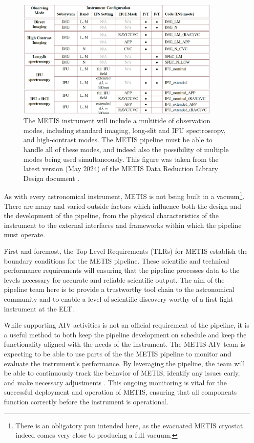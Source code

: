 \documentclass[a4paper]{spie}  %
\begin{document}
\begin{figure}
    \centering
    \includegraphics[width=0.9\textwidth]{SPIE_paper/figures/METIS_modes.png}
    \caption{The METIS instrument will include a multitide of observation modes, including standard imaging, long-slit and IFU spectroscopy, and high-contrast modes. The METIS pipeline must be able to handle all of these modes, and indeed also the possibility of multiple modes being used simultaneously. This figure was taken from the latest version (May 2024) of the METIS Data Reduction Library Design document \cite{DRLD}.}
    \label{fig:metis_modes}
\end{figure}


As with every astronomical instrument, METIS is not being built in a vacuum\footnote{There is an obligatory pun intended here, as the evacuated METIS cryostat indeed comes very close to producing a full vacuum.}. 
There are many and varied outside factors which influence both the design and the development of the pipeline, from the physical characteristics of the instrument to the external interfaces and frameworks within which the pipeline must operate.

First and foremost, the Top Level Requirements (TLRs) for METIS \cite{ESO-257869} establish the boundary conditions for the METIS pipeline.
These scientific and technical performance requirements will ensuring that the pipeline processes data to the levels necessary for accurate and reliable scientific output. 
The aim of the pipeline team here is to provide a trustworthy tool chain to the astronomical community and to enable a level of scientific discovery worthy of a first-light instrument at the ELT. 

While supporting AIV activities is not an official requirement of the pipeline, it is a useful method to both keep the pipeline development on schedule and keep the functionality aligned with the needs of the instrument. 
The METIS AIV team is expecting to be able to use parts of the the METIS pipeline to monitor and evaluate the instrument's performance.
By leveraging the pipeline, the team will be able to continuously track the behavior of METIS, identify any issues early, and make necessary adjustments . 
This ongoing monitoring is vital for the successful deployment and operation of METIS, ensuring that all components function correctly before the instrument is operational.
\end{document}
